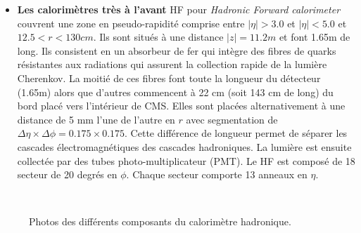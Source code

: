 \begin{itemize}[label=$\bullet$]
	\item \textbf{Les calorimètres très à l'avant} HF pour \textit{Hadronic Forward calorimeter} couvrent une zone en pseudo-rapidité comprise entre $|\eta|>3.0$ et $|\eta|<5.0$ et $12.5<r<130cm$. Ils sont situés à une distance $|z|=11.2m$ et font 1.65m de long. Ils consistent en un absorbeur de fer qui intègre des fibres de quarks résistantes aux radiations qui assurent la collection rapide de la lumière Cherenkov. La moitié de ces fibres font toute la longueur du détecteur (1.65m) alors que d'autres commencent à 22 cm (soit 143 cm de long) du bord placé vers l'intérieur de CMS. Elles sont placées alternativement à une distance de 5 mm l'une de l'autre en $r$  avec segmentation de $\Delta\eta\times\Delta\phi=0.175\times0.175$. Cette différence de longueur permet de séparer les cascades électromagnétiques des cascades hadroniques. La lumière est ensuite collectée par des tubes photo-multiplicateur (PMT). Le HF est composé de 18 secteur de 20 degrés en $\phi$. Chaque secteur comporte 13 anneaux en $\eta$.
\end{itemize}
\begin{figure}[ht!]
\centering
{}
\\
\caption{Photos des différents composants du calorimètre hadronique.}
\end{figure}	

